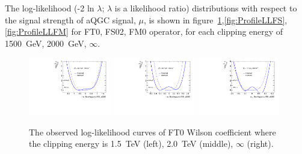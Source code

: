The log-likelihood (-2 ln $\lambda$; $\lambda$ is a likelihood ratio) distributions with respect to the signal strength of aQGC signal, $\mu$, is shown in figure~\ref{fig:ProfileLL},\ref{fig:ProfileLLFS}, \ref{fig:ProfileLLFM} for FT0, FS02, FM0 operator, for each clipping energy of 1500~GeV, 2000~GeV, $\infty$.
\begin{figure}[ht]
    \centering
    \includegraphics[width=0.32\textwidth]{figures/aQGC/profileFT01500}
    	\includegraphics[width=0.32\textwidth]{figures/aQGC/profileFT02000}
        \includegraphics[width=0.32\textwidth]{figures/aQGC/profileFT0inf}
        \caption{The observed log-likelihood curves of FT0 Wilson coefficient where the clipping energy is 1.5~TeV (left), 2.0~TeV (middle), $\infty$ (right).}
        \label{fig:ProfileLL}
\end{figure}
